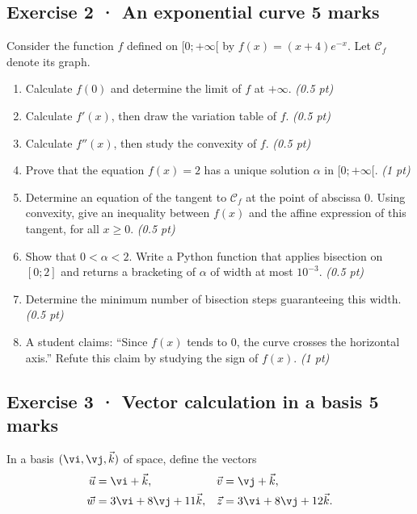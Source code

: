 \subsection*{Exercise 2 · An exponential curve \hfill 5 marks}Consider the function $f$ defined on $[0;+\infty[$ by $f(x)=(x+4)e^{-x}$. Let $\mathcal C_f$ denote its graph.

\begin{enumerate}

\item Calculate $f(0)$ and determine the limit of $f$ at $+\infty$. \hfill\textit{(0.5 pt)}

\item Calculate $f'(x)$, then draw the variation table of $f$. \hfill\textit{(0.5 pt)}

\item Calculate $f''(x)$, then study the convexity of $f$. \hfill\textit{(0.5 pt)}

\item Prove that the equation $f(x)=2$ has a unique solution $\alpha$ in $[0;+\infty[$. \hfill\textit{(1 pt)}

\item Determine an equation of the tangent to $\mathcal C_f$ at the point of abscissa $0$. Using convexity, give an inequality between $f(x)$ and the affine expression of this tangent, for all $x\ge0$. \hfill\textit{(0.5 pt)}

\item Show that $0<\alpha<2$. Write a Python function that applies bisection on $[0;2]$ and returns a bracketing of $\alpha$ of width at most $10^{-3}$. \hfill\textit{(0.5 pt)}

\item Determine the minimum number of bisection steps guaranteeing this width. \hfill\textit{(0.5 pt)}

\clearpage\item A student claims: ``Since $f(x)$ tends to $0$, the curve crosses the horizontal axis.'' Refute this claim by studying the sign of $f(x)$. \hfill\textit{(1 pt)}

\end{enumerate}

\clearpage{}\par

\subsection*{Exercise 3 · Vector calculation in a basis \hfill 5 marks}In a basis $(\vi,\vj,\vec k)$ of space, define the vectors
\[\begin{aligned}\vec u&=\vi+\vec k,&\vec v&=\vj+\vec k,\\
\vec w&=3\vi+8\vj+11\vec k,&\vec z&=3\vi+8\vj+12\vec k.\end{aligned}\]

